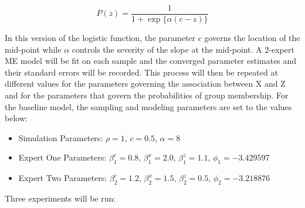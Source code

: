 \documentclass[12pt]{article}
\theoremstyle{definition}
\begin{document}
\begin{equation} \label{eq:general_logistic}
    P(z) = \frac{1}{1 + \exp\{\alpha (c - z)\}}
\end{equation}

In this version of the logistic function, the parameter $c$ governs the location of the mid-point while $\alpha$ controls the severity of the slope at the mid-point. A 2-expert ME model will be fit on each sample and the converged parameter estimates and their standard errors will be recorded. This process will then be repeated at different values for the parameters governing the association between X and Z and for the parameters that govern the probabilities of group membership. For the baseline model, the sampling and modeling parameters are set to the values below:

\begin{itemize}
    \item Simulation Parameters: $\rho = 1$,\; $c = 0.5$,\; $\alpha = 8$
    \item Expert One Parameters: $\beta_{1}^{c} = 0.8$, \; $\beta_{1}^{x} = 2.0$, \; $\beta_{1}^{z} = 1.1$, \; $\phi_{1} = -3.429597$
    \item Expert Two Parameters: $\beta_{2}^{c} = 1.2$, \; $\beta_{2}^{x} = 1.5$, \; $\beta_{2}^{z} = 0.5$, \; $\phi_{2} = -3.218876$
\end{itemize}

Three experiments will be run:
\end{document}
